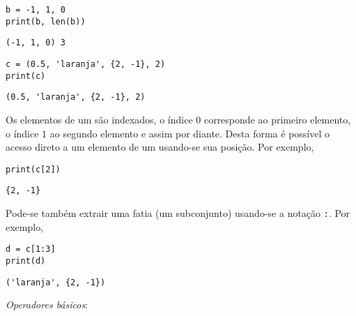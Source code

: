 \documentclass[a4paper,10pt,twoside]{article}
\begin{document}
\begin{lstlisting}
b = -1, 1, 0
print(b, len(b))
\end{lstlisting}

\begin{verbatim}
(-1, 1, 0) 3
\end{verbatim}

\begin{lstlisting}
c = (0.5, 'laranja', {2, -1}, 2)
print(c)
\end{lstlisting}

\begin{verbatim}
(0.5, 'laranja', {2, -1}, 2)
\end{verbatim}

Os elementos de um {\PYTHONtuple} são indexados, o índice $0$ corresponde ao primeiro elemento, o índice $1$ ao segundo elemento e assim por diante. Desta forma é possível o acesso direto a um elemento de um {\PYTHONtuple} usando-se sua posição. Por exemplo,

\begin{lstlisting}
print(c[2])
\end{lstlisting}

\begin{verbatim}
{2, -1}
\end{verbatim}

Pode-se também extrair uma fatia (um subconjunto) usando-se a notação
\texttt{:}. Por exemplo,

\begin{lstlisting}
d = c[1:3]
print(d)
\end{lstlisting}

\begin{verbatim}
('laranja', {2, -1})
\end{verbatim}

\emph{Operadores básicos}:
\end{document}
